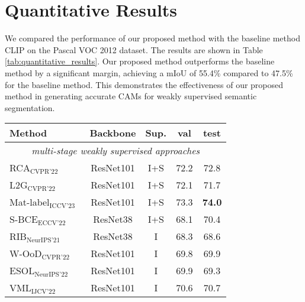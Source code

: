 
\section{Quantitative Results}
\label{subsec: Quantitative Results}
We compared the performance of our proposed method with the baseline method CLIP \cite{wsss_frozen_clip} on the Pascal VOC 2012 dataset. The results are shown in Table \ref{tab:quantitative_results}. Our proposed method outperforms the baseline method by a significant margin, achieving a mIoU of 55.4\% compared to 47.5\% for the baseline method. This demonstrates the effectiveness of our proposed method in generating accurate CAMs for weakly supervised semantic segmentation.

\begin{table}[ht]
    \centering
    \renewcommand{\arraystretch}{1.2}
    \setlength{\tabcolsep}{6pt}
    \begin{tabular}{l c c c c}
        \hline
        Method                                                              & Backbone   & Sup. & val           & test          \\
        \hline
        \multicolumn{5}{c}{\textit{multi-stage weakly supervised approaches}}                                                   \\
        RCA$_{\text{CVPR'22}}$~\cite{multi_stage_approaches_RCA}            & ResNet101  & I+S  & 72.2          & 72.8          \\
        L2G$_{\text{CVPR'22}}$~\cite{multi_stage_approaches_L2G}            & ResNet101  & I+S  & 72.1          & 71.7          \\
        Mat-label$_{\text{ICCV'23}}$~\cite{multi_stage_approaches_MatLabel} & ResNet101  & I+S  & 73.3          & \textbf{74.0} \\
        S-BCE$_{\text{ECCV'22}}$~\cite{49}                                  & ResNet38   & I+S  & 68.1          & 70.4          \\
        RIB$_{\text{NeurIPS'21}}$~\cite{23}                                 & ResNet38   & I    & 68.3          & 68.6          \\
        W-OoD$_{\text{CVPR'22}}$~\cite{24}                                  & ResNet101  & I    & 69.8          & 69.9          \\
        ESOL$_{\text{NeurIPS'22}}$~\cite{25}                                & ResNet101  & I    & 69.9          & 69.3          \\
        VML$_{\text{IJCV'22}}$~\cite{38}                                    & ResNet101  & I    & 70.6          & 70.7          \\

\end{tabular}
\end{table}
